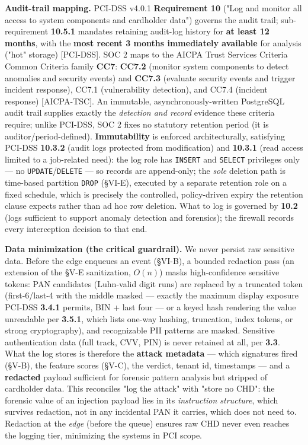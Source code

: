 \textbf{Audit-trail mapping.} PCI-DSS v4.0.1 \textbf{Requirement 10}
("Log and monitor all access to system components and cardholder data")
governs the audit trail; sub-requirement \textbf{10.5.1} mandates
retaining audit-log history for \textbf{at least 12 months}, with the
\textbf{most recent 3 months immediately available} for analysis ("hot"
storage) {[}PCI-DSS{]}. SOC 2 maps to the AICPA Trust Services Criteria
Common Criteria family \textbf{CC7}: \textbf{CC7.2} (monitor system
components to detect anomalies and security events) and \textbf{CC7.3}
(evaluate security events and trigger incident response), CC7.1
(vulnerability detection), and CC7.4 (incident response)
{[}AICPA-TSC{]}. An immutable, asynchronously-written PostgreSQL audit
trail supplies exactly the \emph{detection and record} evidence these
criteria require; unlike PCI-DSS, SOC 2 fixes no statutory retention
period (it is auditor/period-defined). \textbf{Immutability} is enforced
architecturally, satisfying PCI-DSS \textbf{10.3.2} (audit logs
protected from modification) and \textbf{10.3.1} (read access limited to
a job-related need): the log role has \passthrough{\lstinline!INSERT!}
and \passthrough{\lstinline!SELECT!} privileges only --- no
\passthrough{\lstinline!UPDATE!}/\passthrough{\lstinline!DELETE!} --- so
records are append-only; the \emph{sole} deletion path is time-based
partition \passthrough{\lstinline!DROP!} (§VI-E), executed by a separate
retention role on a fixed schedule, which is precisely the controlled,
policy-driven expiry the retention clause expects rather than ad hoc row
deletion. What to log is governed by \textbf{10.2} (logs sufficient to
support anomaly detection and forensics); the firewall records every
interception decision to that end.

\textbf{Data minimization (the critical guardrail).} We never persist
raw sensitive data. Before the edge enqueues an event (§VI-B), a bounded
redaction pass (an extension of the §V-E sanitization, \(O(n)\)) masks
high-confidence sensitive tokens: PAN candidates (Luhn-valid digit runs)
are replaced by a truncated token (first-6/last-4 with the middle masked
--- exactly the maximum display exposure PCI-DSS \textbf{3.4.1} permits,
BIN + last four --- or a keyed hash rendering the value unreadable per
\textbf{3.5.1}, which lists one-way hashing, truncation, index tokens,
or strong cryptography), and recognizable PII patterns are masked.
Sensitive authentication data (full track, CVV, PIN) is never retained
at all, per \textbf{3.3}. What the log stores is therefore the
\textbf{attack metadata} --- which signatures fired (§V-B), the feature
scores (§V-C), the verdict, tenant id, timestamps --- and a
\textbf{redacted} payload sufficient for forensic pattern analysis but
stripped of cardholder data. This reconciles "log the attack" with
"store no CHD": the forensic value of an injection payload lies in its
\emph{instruction structure}, which survives redaction, not in any
incidental PAN it carries, which does not need to. Redaction at the
\emph{edge} (before the queue) ensures raw CHD never even reaches the
logging tier, minimizing the systems in PCI scope.


